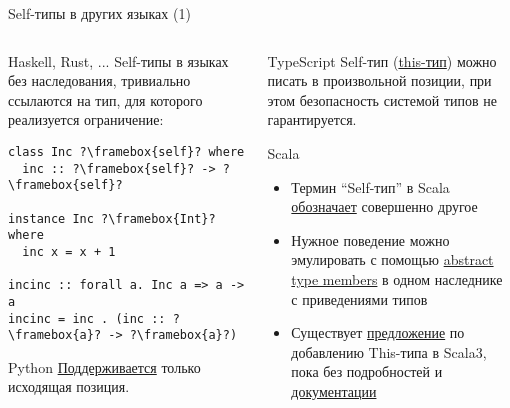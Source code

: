 \documentclass[handout,aspectratio=169,usenames,dvipsnames]{beamer}
\begin{document}
\begin{frame}[fragile]{Self-типы в других языках (1)}
    \begin{columns}[onlytextwidth]
        \begin{column}{0.48\textwidth}
            \begin{block}{Haskell, Rust, ...}
                Self-типы в языках без наследования, тривиально ссылаются на тип, для которого реализуется ограничение:
                \begin{verbatim}
class Inc ?\framebox{self}? where
  inc :: ?\framebox{self}? -> ?\framebox{self}?

instance Inc ?\framebox{Int}? where
  inc x = x + 1

incinc :: forall a. Inc a => a -> a
incinc = inc . (inc :: ?\framebox{a}? -> ?\framebox{a}?)
                \end{verbatim}
            \end{block}
            \pause
            \begin{block}{Python}
                \href{https://peps.python.org/pep-0673/}{\color{blue}Поддерживается}
                 только исходящая позиция.
            \end{block}
        \end{column}\hfill%
        \pause
        \begin{column}{0.49\textwidth}
            \begin{block}{TypeScript}
                Self-тип (\href{https://www.typescriptlang.org/docs/handbook/2/classes.html\#this-types}{\color{blue}this-тип}) можно писать в произвольной позиции, при этом безопасность системой типов не гарантируется.
            \end{block}
            \pause
            \begin{block}{Scala}
                \begin{itemize}
                    \item Термин ``Self-тип'' в Scala \href{https://docs.scala-lang.org/tour/self-types.html}{\color{blue} обозначает} совершенно другое
                    \item Нужное поведение можно эмулировать с помощью \href{https://docs.scala-lang.org/tour/abstract-type-members.html}{\color{blue}abstract type members} в одном наследнике с приведениями типов
                    \item Существует \href{https://github.com/lampepfl/dotty/issues/7374}{\color{blue}предложение} по добавлению This-типа в Scala3, пока без подробностей и \href{http://dotty.epfl.ch/}{\color{blue}документации}
                \end{itemize}
            \end{block}
        \end{column}
    \end{columns}
\end{frame}
\end{document}
